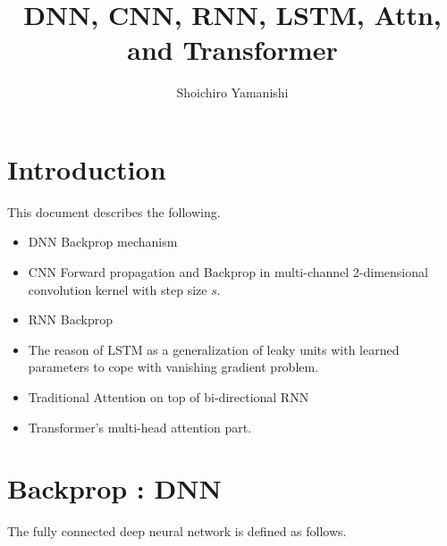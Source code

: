 \documentclass[a4]{article}
\title{DNN, CNN, RNN, LSTM, Attn, and Transformer}
\author{Shoichiro Yamanishi}
\begin{document}
\maketitle


\section{Introduction}

This document describes the following.
\begin{itemize}

\item DNN Backprop mechanism

\item CNN Forward propagation and Backprop in multi-channel 2-dimensional convolution kernel with step size $s$.

\item RNN Backprop

\item The reason of LSTM as a generalization of leaky units with learned parameters to cope with vanishing gradient problem.

\item Traditional Attention on top of bi-directional RNN

\item Transformer's multi-head attention part.

\end{itemize}

\section{Backprop : DNN}
The fully connected deep neural network is defined as follows.
\end{document}
